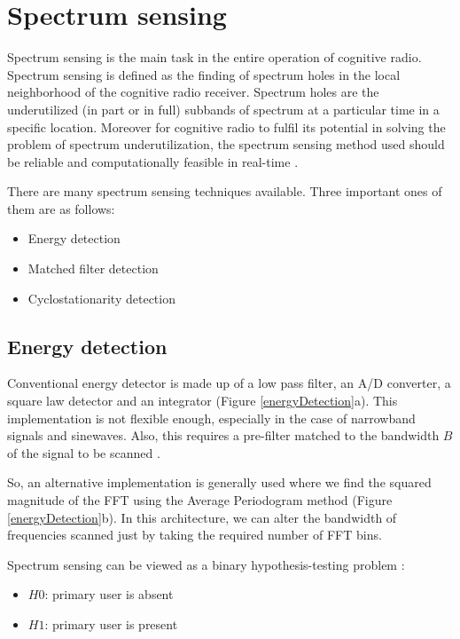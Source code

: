 \chapter{Spectrum sensing}

Spectrum sensing is the main task in the entire operation of cognitive
radio. Spectrum sensing is defined as the finding of spectrum holes in 
the local neighborhood of the cognitive radio receiver. Spectrum holes are the
underutilized (in part or in full) subbands of spectrum at a particular time
in a specific location. Moreover for cognitive radio to fulfil its potential
in solving the problem of spectrum underutilization, the spectrum sensing 
method used should be reliable and computationally feasible in real-time 
\cite{haykin09}.

There are many spectrum sensing techniques available. Three important ones of
them are as follows:
\begin{itemize}
    \item Energy detection
    \item Matched filter detection
    \item Cyclostationarity detection
\end{itemize}

\section{Energy detection}

Conventional energy detector is made up of a low pass filter, an A/D 
converter, a square law detector and an integrator (Figure 
\ref{energyDetection}a). This implementation is not flexible enough, 
especially in the case of narrowband signals and sinewaves. Also, this 
requires a pre-filter matched to the bandwidth $B$ of the signal to be scanned
\cite{cabric06}.

So, an alternative implementation is generally used where we find the squared 
magnitude of the FFT using the Average Periodogram method (Figure 
\ref{energyDetection}b). In this architecture, we can alter the bandwidth of
frequencies scanned just by taking
the required number of FFT bins. 

Spectrum sensing can be viewed as a binary hypothesis-testing problem 
\cite{zhang09}:
\begin{itemize}[noitemsep,topsep=0pt,parsep=0pt,partopsep=0pt]
    \item $H0$: primary user is absent
    \item $H1$: primary user is present
\end{itemize}

